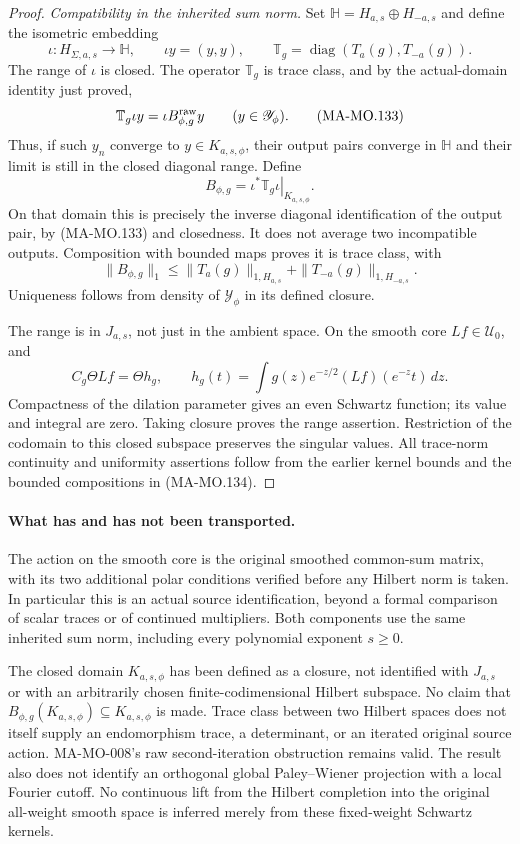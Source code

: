 \begin{proof}
\emph{Compatibility in the inherited sum norm.}
Set \(\mathbb H=H_{a,s}\oplus H_{-a,s}\) and define
the isometric embedding
\[
 \iota:H_{\Sigma,a,s}\longrightarrow\mathbb H,
             \qquad \iota y=(y,y),\qquad
 \mathbb T_g=\operatorname{diag}(T_a(g),T_{-a}(g)).
 \tag{MA-MO.132}
\]
The range of \(\iota\) is closed. The operator
\(\mathbb T_g\) is trace class, and by the actual-domain
identity just proved,
\[
       \mathbb T_g\iota y=\iota B_{\phi,g}^{\rm raw}y
                       \qquad(y\in\mathscr Y_\phi).
 \tag{MA-MO.133}
\]
Thus, if such \(y_n\) converge to \(y\in K_{a,s,\phi}\),
their output pairs converge in \(\mathbb H\) and their
limit is still in the closed diagonal range. Define
\[
 B_{\phi,g}=\left.\iota^*\mathbb T_g\iota\right|_{K_{a,s,\phi}}.
 \tag{MA-MO.134}
\]
On that domain this is precisely the inverse diagonal
identification of the output pair, by (MA-MO.133) and
closedness. It does not average two incompatible outputs.
Composition with bounded maps proves it is trace class,
with
\[
       \|B_{\phi,g}\|_1
           \le\|T_a(g)\|_{1,H_{a,s}}
                    +\|T_{-a}(g)\|_{1,H_{-a,s}}.
 \tag{MA-MO.135}
\]
Uniqueness follows from density of \(\mathscr Y_\phi\)
in its defined closure.

The range is in \(J_{a,s}\), not just in the ambient
space. On the smooth core \(Lf\in\mathscr U_0\), and
\[
 C_g\Theta Lf=\Theta h_g,\qquad
 h_g(t)=\int g(z)e^{-z/2}(Lf)(e^{-z}t)\,dz.
 \tag{MA-MO.136}
\]
Compactness of the dilation parameter gives an even
Schwartz function; its value and integral are zero.
Taking closure proves the range assertion. Restriction
of the codomain to this closed subspace preserves the
singular values. All trace-norm continuity and uniformity
assertions follow from the earlier kernel bounds and
the bounded compositions in (MA-MO.134).
\end{proof}

\paragraph{What has and has not been transported.}
The action on the smooth core is the original smoothed
common-sum matrix, with its two additional polar conditions
verified before any Hilbert norm is taken. In particular
this is an actual source identification, beyond a formal
comparison of scalar traces or of continued multipliers.
Both components use the same inherited sum norm, including
every polynomial exponent \(s\ge0\).

The closed domain \(K_{a,s,\phi}\) has been defined as a
closure, not identified with \(J_{a,s}\) or with an
arbitrarily chosen finite-codimensional Hilbert subspace.
No claim that \(B_{\phi,g}(K_{a,s,\phi})\subseteq
K_{a,s,\phi}\) is made. Trace class between two Hilbert
spaces does not itself supply an endomorphism trace,
a determinant, or an iterated original source action.
MA-MO-008's raw second-iteration obstruction remains valid.
The result also does not identify an orthogonal global
Paley--Wiener projection with a local Fourier cutoff.
No continuous lift from the Hilbert completion into the
original all-weight smooth space is inferred merely from
these fixed-weight Schwartz kernels.

